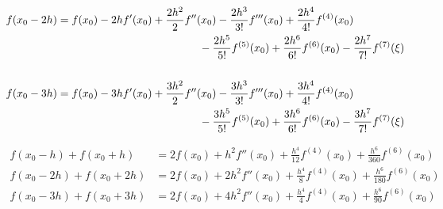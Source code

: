 \documentclass[leqno]{article}
\begin{document}
\begin{align*}
    \begin{split}
        f(x_0 - 2h) {}&= f(x_0) - 2h f'(x_0) + \frac{2h^2}{2} f''(x_0) - \frac{2h^3}{3!} f'''(x_0) + \frac{2h^4}{4!} f^{(4)}(x_0) \\
        & \hspace{1.8in} - \frac{2h^5}{5!} f^{(5)}(x_0) + \frac{2h^6}{6!}f^{(6)}(x_0) - \frac{2h^7}{7!}f^{(7)}(\xi)
    \end{split}
    \\
    \\
    \begin{split}
        f(x_0 - 3h) &= f(x_0) - 3h f'(x_0) + \frac{3h^2}{2} f''(x_0) - \frac{3h^3}{3!} f'''(x_0) + \frac{3h^4}{4!} f^{(4)}(x_0) \\
        & \hspace{1.8in} - \frac{3h^5}{5!} f^{(5)}(x_0) + \frac{3h^6}{6!}f^{(6)}(x_0) - \frac{3h^7}{7!}f^{(7)}(\xi)
    \end{split}
\end{align*}

\newpage

\begin{align*}
    f(x_0 - h) + f(x_0 + h) &= 2f(x_0) + h^2 f''(x_0) + \frac{h^4}{12} f^{(4)}(x_0) + \frac{h^6}{360}f^{(6)}(x_0) \\
    f(x_0 - 2h) + f(x_0 + 2h) &= 2f(x_0) + 2h^2 f''(x_0) + \frac{h^4}{8} f^{(4)}(x_0) + \frac{h^6}{180}f^{(6)}(x_0) \\
    f(x_0 - 3h) + f(x_0 + 3h) &= 2f(x_0) + 4h^2 f''(x_0) + \frac{h^4}{4} f^{(4)}(x_0) + \frac{h^6}{90}f^{(6)}(x_0) \\
\end{align*}
\end{document}
